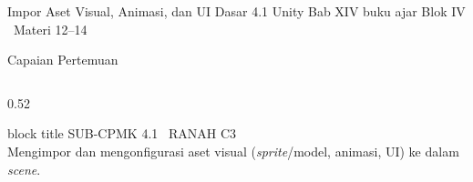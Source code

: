 \documentclass[aspectratio=169,10pt]{beamer}
\begin{document}
  {Impor Aset Visual, Animasi, dan UI Dasar}
  {4.1}
  {Unity}
  {Bab XIV buku ajar}
  {Blok IV \textperiodcentered\ Materi 12--14}

\begin{frame}{Capaian Pertemuan}
\begin{columns}[T,onlytextwidth]
  \begin{column}{0.52\textwidth}
    \begin{beamercolorbox}[wd=\linewidth,sep=5pt,rounded=true]{block title}
      {\fontsize{6.8}{8}\selectfont\color{ubHead}SUB-CPMK 4.1 \textperiodcentered\ RANAH C3}\\[2pt]
      {\footnotesize Mengimpor dan mengonfigurasi aset visual
       (\emph{sprite}/model, animasi, UI) ke dalam \emph{scene}.}
    \end{beamercolorbox}
    \vspace{0.14cm}


\end{column}
\end{columns}
\end{frame}
\end{document}
